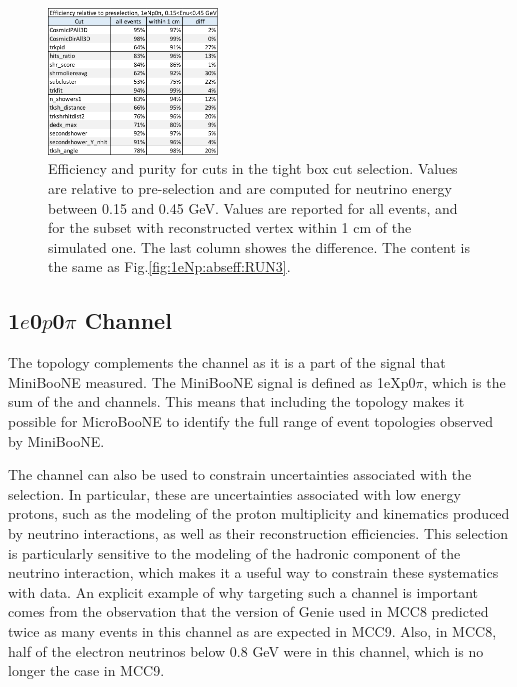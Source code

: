 \begin{figure}[H]
\begin{center}
\includegraphics[width=0.40\textwidth]{1eNp/cuts-eff-rel-presel.pdf}
\caption{\label{fig:1eNp:cutflow:rel} Efficiency and purity for cuts in the tight box cut \npsel selection. Values are relative to pre-selection and are computed for neutrino energy between 0.15 and 0.45 GeV. Values are reported for all events, and for the subset with reconstructed vertex within 1 cm of the simulated one. The last column showes the difference. The content is the same as Fig.\cref{fig:1eNp:abseff:RUN3}. }
\end{center}
\end{figure}


\subsection{1$e$0$p$0$\pi$ Channel }
\label{sec:nueselection:1e0p}

The \zpsel topology complements the \npsel channel as it is a part of the signal that MiniBooNE measured. The MiniBooNE signal is defined as 1eXp0$\pi$, which is the sum of the \npsel and \zpsel channels. This means that including the \zpsel topology makes it possible for MicroBooNE to identify the full range of event topologies observed by MiniBooNE.    

The \zpsel channel can also be used to constrain uncertainties associated with the \npsel selection.  In particular, these are uncertainties associated with low energy protons, such as the modeling of the proton multiplicity and kinematics produced by neutrino interactions, as well as their reconstruction efficiencies.  This selection is particularly sensitive to the modeling of the hadronic component of the neutrino interaction, which makes it a useful way to constrain these systematics with data. An explicit example of why targeting such a channel is important comes from the observation that the version of Genie used in MCC8 predicted twice as many events in this channel as are expected in MCC9.  Also, in MCC8, half of the electron neutrinos below 0.8 GeV were in this channel, which is no longer the case in MCC9.

